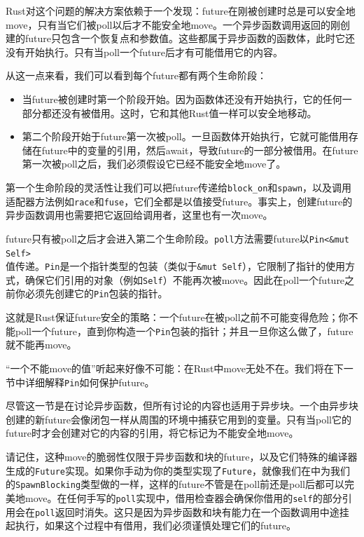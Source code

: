 Rust对这个问题的解决方案依赖于一个发现：future在刚被创建时总是可以安全地move，只有当它们被poll以后才不能安全地move。一个异步函数调用返回的刚创建的future只包含一个恢复点和参数值。这些都属于异步函数的函数体，此时它还没有开始执行。只有当poll一个future后才有可能借用它的内容。

从这一点来看，我们可以看到每个future都有两个生命阶段：
\begin{itemize}
    \item 当future被创建时第一个阶段开始。因为函数体还没有开始执行，它的任何一部分都还没有被借用。这时，它和其他Rust值一样可以安全地移动。
    \item 第二个阶段开始于future第一次被poll。一旦函数体开始执行，它就可能借用存储在future中的变量的引用，然后await，导致future的一部分被借用。在future第一次被poll之后，我们必须假设它已经不能安全地move了。
\end{itemize}

第一个生命阶段的灵活性让我们可以把future传递给\texttt{block\_on}和\texttt{spawn}，以及调用适配器方法例如\texttt{race}和\texttt{fuse}，它们全都是以值接受future。事实上，创建future的异步函数调用也需要把它返回给调用者，这里也有一次move。

future只有被poll之后才会进入第二个生命阶段。\texttt{poll}方法需要future以\texttt{Pin<\&mut Self>}\\
值传递。\texttt{Pin}是一个指针类型的包装（类似于\texttt{\&mut Self}），它限制了指针的使用方式，确保它们引用的对象（例如\texttt{Self}）不能再次被move。因此在poll一个future之前你必须先创建它的\texttt{Pin}包装的指针。

这就是Rust保证future安全的策略：一个future在被poll之前不可能变得危险；你不能poll一个future，直到你构造一个\texttt{Pin}包装的指针；并且一旦你这么做了，future就不能再move。

“一个不能move的值”听起来好像不可能：在Rust中move无处不在。我们将在下一节中详细解释\texttt{Pin}如何保护future。

尽管这一节是在讨论异步函数，但所有讨论的内容也适用于异步块。一个由异步块创建的新future会像闭包一样从周围的环境中捕获它用到的变量。只有当poll它的future时才会创建对它的内容的引用，将它标记为不能安全地move。

请记住，这种move的脆弱性仅限于异步函数和块的future，以及它们特殊的编译器生成的\texttt{Future}实现。如果你手动为你的类型实现了\texttt{Future}，就像我们在中为我们的\texttt{SpawnBlocking}类型做的一样，这样的future不管是在poll前还是poll后都可以完美地move。在任何手写的\texttt{poll}实现中，借用检查器会确保你借用的\texttt{self}的部分引用会在\texttt{poll}返回时消失。这只是因为异步函数和块有能力在一个函数调用中途挂起执行，如果这个过程中有借用，我们必须谨慎处理它们的future。

